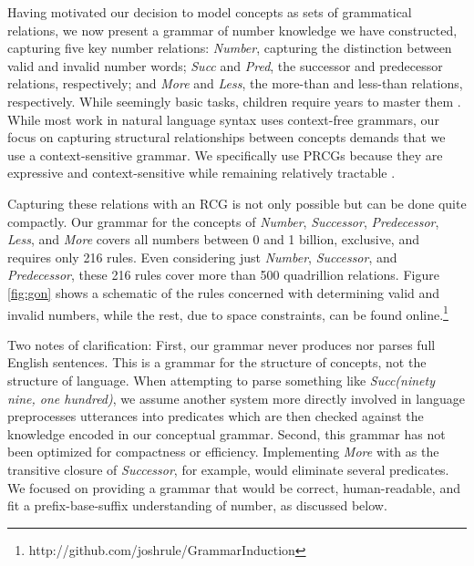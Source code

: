 \documentclass[10pt,letterpaper]{article}
\begin{document}
Having motivated our decision to model concepts as sets of grammatical
relations, we now present a grammar of number knowledge we have
constructed, capturing five key number relations: \emph{Number},
capturing the distinction between valid and invalid number words;
\emph{Succ} and \emph{Pred}, the successor and predecessor relations,
respectively; and \emph{More} and \emph{Less}, the more-than and
less-than relations, respectively. While seemingly basic tasks,
children require years to master them \citep{FusRicBriar1982}. While
most work in natural language syntax uses context-free grammars, our
focus on capturing structural relationships between concepts demands
that we use a context-sensitive grammar. We specifically use PRCGs
because they are expressive and context-sensitive while remaining
relatively tractable \citep{boullier2005range}.

Capturing these relations with an RCG is not only possible but can
be done quite compactly. Our grammar for the concepts of
\emph{Number}, \emph{Successor}, \emph{Predecessor}, \emph{Less}, and
\emph{More} covers all numbers between 0 and 1 billion, exclusive, and
requires only 216 rules. Even considering just \emph{Number},
\emph{Successor}, and \emph{Predecessor}, these 216 rules cover more
than 500 quadrillion relations. Figure \ref{fig:gon} shows a schematic
of the rules concerned with determining valid and invalid numbers,
while the rest, due to space constraints, can be found
online.\footnote{http://github.com/joshrule/GrammarInduction}

Two notes of clarification: First, our grammar never produces nor
parses full English sentences. This is a grammar for the structure of
concepts, not the structure of language. When attempting to parse
something like \emph{Succ(ninety nine, one hundred)}, we assume
another system more directly involved in language preprocesses
utterances into predicates which are then checked against the
knowledge encoded in our conceptual grammar. Second, this grammar has
not been optimized for compactness or efficiency. Implementing
\emph{More} with as the transitive closure of \emph{Successor}, for
example, would eliminate several predicates. We focused on providing a
grammar that would be correct, human-readable, and fit a
prefix-base-suffix understanding of number, as discussed below.
\end{document}
